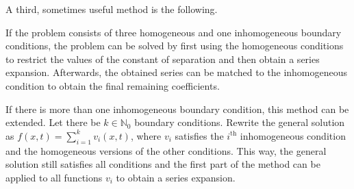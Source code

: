     A third, sometimes useful method is the following.
    \begin{method}
        If the problem consists of three homogeneous and one inhomogeneous boundary conditions, the problem can be solved by first using the homogeneous conditions to restrict the values of the constant of separation and then obtain a series expansion. Afterwards, the obtained series can be matched to the inhomogeneous condition to obtain the final remaining coefficients.

        If there is more than one inhomogeneous boundary condition, this method can be extended. Let there be $k\in\mathbb{N}_0$ boundary conditions. Rewrite the general solution as $f(x,t) = \sum_{i=1}^kv_i(x,t)$, where $v_i$ satisfies the $i^{\text{th}}$ inhomogeneous condition and the homogeneous versions of the other conditions. This way, the general solution still satisfies all conditions and the first part of the method can be applied to all functions $v_i$ to obtain a series expansion.
    \end{method}

